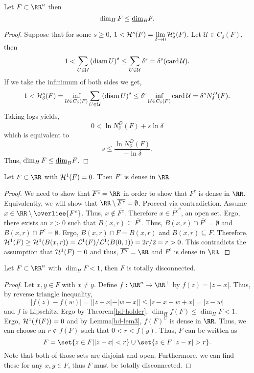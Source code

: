 \begin{thm}
	Let $F\subset\RR^n$ then
	\[
		\operatorname{dim}_H F \leq \underline{\operatorname{dim}}_B F.
	\]
\end{thm}
\begin{proof}
	Suppose that for some $s\geq 0$, $1<\mathcal{H}^s(F)=\lim\limits_{\delta\rightarrow 0}\mathcal{H}^s_\delta(F)$.
	Let $\mathcal{U}\in C_\delta(F)$, then
	\[
		1 < \sum_{U\in\mathcal{U}}{(\operatorname{diam} U)}^s
		\leq\sum_{U\in\mathcal{U}}\delta^s
		=\delta^s (\operatorname{card} \mathcal{U}).
	\]
	If we take the infinimum of both sides we get,
	\[
		1 < \mathcal{H}^s_\delta(F)
		=\inf_{\mathcal{U}\in C_\delta(F)}\sum_{U\in\mathcal{U}} {(\operatorname{diam}{U})}^s
		\leq \delta^s\inf_{\mathcal{U}\in C_\delta(F)}\operatorname{card}{\mathcal{U}}
		=\delta^s N_\delta^D(F).
	\]
	Taking logs yields,
	\[
		0 < \ln N_\delta^D(F)+s\ln \delta
	\]
	which is equivalent to
	\[
		s\leq \frac{\ln N^D_\delta(F)}{-\ln\delta}.
	\]
	Thus, $\operatorname{dim}_H F\leq \underline{\operatorname{dim}}_B F$.
\end{proof}

\begin{lemma}\label{hd-lem3}
	Let $F\subset\RR$ with $\mathcal{H}^1(F) = 0$.
	Then $F^c$ is dense in $\RR$
\end{lemma}

\begin{proof}
	We need to show that $\overline{F^c}=\RR$ in order to show that $F^c$ is dense in $\RR$.
	Equivalently, we will show that $\RR\setminus\overline{F^c}=\emptyset$.
	Proceed via contradiction.
	Assume $x\in\RR\setminus\overliee{F^c}$.
	Thus, $x\notin\overline{F^c}$.
	Therefore $x\in{\overline{F^c}}^c$, an open set.
	Ergo, there exists an $r>0$ such that $B(x,r)\subseteq\overline{F^c}$.
	Thus, $B(x,r)\cap\overline{F^c}=\emptyset$ and $B(x,r)\cap F^c=\emptyset$.
	Ergo, $B(x,r)\cap F = B(x,r)$ and $B(x,r)\subseteq F$.
	Therefore, $\mathcal{H}^1(F)\geq\mathcal{H}^1(B(x,r))=\mathcal{L}^1(F)/\mathcal{L}^1(B(0,1))=2r/2=r>0$.
	This contradicts the assumption that $\mathcal{H}^1(F)=0$ and thus, $\overline{F^c}=\RR$ and $F^c$ is dense in $\RR$.
\end{proof}

\begin{thm}
	Let $F\subset\RR^n$ with $\dim_H F < 1$, then $F$ is totally disconnected.
\end{thm}

\begin{proof}
	Let $x,y\in F$ with $x\neq y$.
	Define $f:\RR^n\rightarrow\RR^+$ by $f(z)=|z-x|$.
	Thus, by reverse triangle inequality,
	\[
		|f(z)-f(w)|=||z-x|-|w-x||\leq|z-x-w+x|=|z-w|
	\]
	and $f$ is Lipschitz.
	Ergo by Theorem\autoref{hd-holder}, $\dim_H f(F) \leq \dim_H F < 1$.
	Ergo, $\mathcal{H}^1(f(F))=0$ and by Lemma\autoref{hd-lem3}, ${f(F)}^C$ is dense in $\RR$.
	Thus, we can choose an $r\notin f(F)$ such that $0<r<f(y)$.
	Thus, $F$ can be written as
	\[
		F=\set{z\in F| |z-x|< r}\cup\set{z\in F| |z-x| >r}.
	\]
	Note that both of those sets are disjoint and open.
	Furthermore, we can find these for any $x,y\in F$, thus $F$ must be totally disconnected.
\end{proof}

